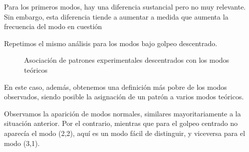 \documentclass[journal, a4paper,onecolumn]{IEEEtran}
\begin{document}
Para los primeros modos, hay una diferencia sustancial pero no muy relevante. Sin embargo, esta diferencia tiende a aumentar a medida que aumenta la frecuencia del modo en cuestión\newline

Repetimos el mismo análisis para los modos bajo golpeo descentrado.

\begin{figure}[H]%
\centering

   
    \end{figure}
    
    \begin{figure}[H]%
    \centering
  
     
    \end{figure}
    
     \begin{figure}[H]%
    \centering
     \caption{Asociación de patrones experimentales descentrados con los modos teóricos}
     
    \end{figure}
    
En este caso, además, obtenemos una definición más pobre de los modos observados, siendo posible la asignación de un patrón a varios modos teóricos. \newline

Observamos la aparición de modos normales, similares mayoritariamente a la situación anterior. Por el contrario, mientras que para el golpeo centrado no aparecía el modo (2,2), aquí es un modo fácil de distinguir, y viceversa para el modo (3,1). \newline
\end{document}
